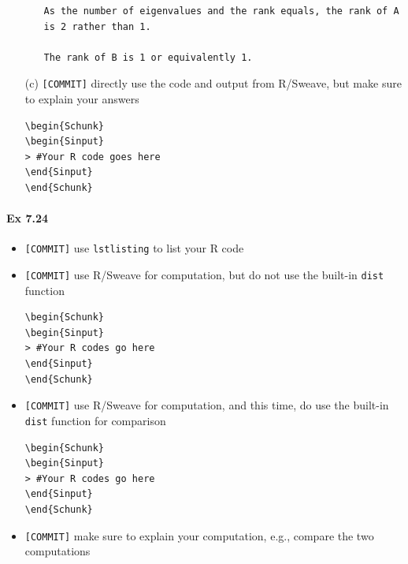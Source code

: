 \documentclass[12pt]{article}
\begin{document}
\begin{itemize}
\begin{itemize}
\begin{lstlisting}
As the number of eigenvalues and the rank equals, the rank of A is 2 rather than 1.

The rank of B is 1 or equivalently 1.
\end{lstlisting}
        \end{itemize}
    \item[(c)] \verb+[COMMIT]+   directly use the code and output from R/Sweave, but make sure
        to explain your answers
\begin{lstlisting}
\begin{Schunk}
\begin{Sinput}
> #Your R code goes here
\end{Sinput}
\end{Schunk}
\end{lstlisting}
\end{itemize}
\paragraph{Ex 7.24}
\begin{itemize}
    \item \verb+[COMMIT]+ use \verb+lstlisting+ to list your R code
    \item \verb+[COMMIT]+ use R/Sweave for computation, but do not use the built-in \verb+dist+
        function
\begin{lstlisting}
\begin{Schunk}
\begin{Sinput}
> #Your R codes go here
\end{Sinput}
\end{Schunk}
\end{lstlisting}
    \item \verb+[COMMIT]+ use R/Sweave for computation, and this time, do use the built-in \verb+dist+
        function for comparison
\begin{lstlisting}
\begin{Schunk}
\begin{Sinput}
> #Your R codes go here
\end{Sinput}
\end{Schunk}
\end{lstlisting}
    \item \verb+[COMMIT]+ make sure to explain your computation, e.g., compare the two
        computations
\end{itemize}
\end{document}
